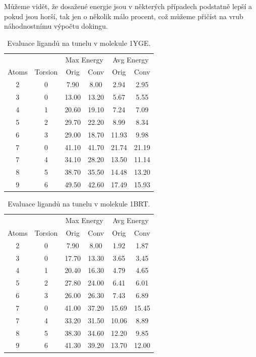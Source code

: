 Můžeme vidět, že dosažené energie jsou v některých případech podstatně lepší
a pokud jsou horší, tak jen o několik málo procent, což můžeme přičíst na vrub
náhodnostnímu výpočtu dokingu.

\begin{table}[ht]
    \centering
    \begin{tabular}{cccccc}
    \toprule
        & & \multicolumn{2}{c}{Max Energy} & \multicolumn{2}{c}{Avg Energy} \\
        Atoms & Torsion & Orig & Conv & Orig & Conv \\
        \midrule
            2 & 0 & 7.90  &8.00 & 2.94 & 2.95 \\
            3 & 0 & 13.00 & 13.20 & 5.67 & 5.55 \\
            4 & 1 & 20.60 & 19.10 & 7.24 & 7.09 \\
            5 & 2 & 29.70 & 22.20 & 8.99 & 8.34 \\
            6 & 3 & 29.00 & 18.70 & 11.93 & 9.98 \\
            7 & 0 & 41.10 & 41.70 & 21.74 & 21.19 \\
            7 & 4 & 34.10 & 28.20 & 13.50 & 11.14 \\
            8 & 5 & 38.70 & 35.50 & 14.48 & 13.20 \\
            9 & 6 & 49.50 & 42.60 & 17.49 & 15.93 \\
        \bottomrule
    \end{tabular}
    \caption{Evaluace ligandů na tunelu v molekule 1YGE.}
    \label{table:1YGE_energy}
\end{table}

\begin{table}[ht]
    \centering
    \begin{tabular}{cccccc}
    \toprule
        & & \multicolumn{2}{c}{Max Energy} & \multicolumn{2}{c}{Avg Energy} \\
        Atoms & Torsion & Orig & Conv & Orig & Conv \\
        \midrule
            2 & 0 & 7.90 & 8.00 & 1.92 & 1.87 \\
            3 & 0 & 17.70 & 13.30 & 3.65 & 3.45 \\
            4 & 1 & 20.40 & 16.30 & 4.79 & 4.65 \\
            5 & 2 & 27.80 & 24.00 & 6.41 & 6.01 \\
            6 & 3 & 26.00 & 26.30 & 7.43 & 6.89 \\
            7 & 0 & 41.00 & 37.20 & 15.69 & 15.45 \\
            7 & 4 & 33.20 & 31.50 & 10.06 & 8.89 \\
            8 & 5 & 38.30 & 34.60 & 12.20 & 9.85 \\
            9 & 6 & 41.30 & 39.20 & 13.70 & 12.00 \\
        \bottomrule
    \end{tabular}
    \caption{Evaluace ligandů na tunelu v molekule 1BRT.}
    \label{table:1BRT_energy}
\end{table}

